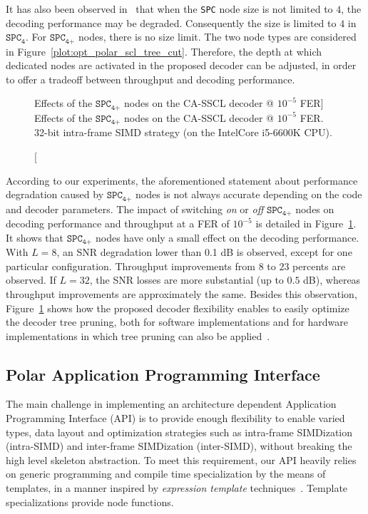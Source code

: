 It has also been observed in~\cite{Sarkis2016} that when the \verb|SPC| node
size is not limited to $4$, the decoding performance may be degraded.
Consequently the size is limited to $4$ in $\texttt{SPC}_\texttt{4}$. For
$\texttt{SPC}_\texttt{4+}$ nodes, there is no size limit. The two node types are
considered in Figure~\ref{plot:opt_polar_scl_tree_cut}. Therefore, the depth at
which dedicated nodes are activated in the proposed decoder can be adjusted, in
order to offer a tradeoff between throughput and decoding performance.

\begin{figure}[htp]
  \centering
  \caption
    [Effects of the $\texttt{SPC}_\texttt{4+}$ nodes on the CA-SSCL decoder @
     $10^{-5}$ FER]
    {Effects of the $\texttt{SPC}_\texttt{4+}$ nodes on the CA-SSCL decoder @
     $10^{-5}$ FER. 32-bit intra-frame SIMD strategy (on the Intel\R Core\TM
     i5-6600K CPU).}
  \label{plot:opt_polar_scl_spc}
\end{figure}

According to our experiments, the aforementioned statement about performance
degradation caused by $\texttt{SPC}_\texttt{4+}$ nodes is not always accurate
depending on the code and decoder parameters. The impact of switching
\textit{on} or \textit{off} $\texttt{SPC}_\texttt{4+}$ nodes on decoding
performance and throughput at a FER of $10^{-5}$ is detailed in
Figure~\ref{plot:opt_polar_scl_spc}. It shows that $\texttt{SPC}_\texttt{4+}$
nodes have only a small effect on the decoding performance. With $L=8$, an SNR
degradation lower than 0.1 dB is observed, except for one particular
configuration. Throughput improvements from $8$ to $23$ percents are observed.
If $L=32$, the SNR losses are more substantial (up to $0.5$ dB), whereas
throughput improvements are approximately the same. Besides this observation,
Figure~\ref{plot:opt_polar_scl_spc} shows how the proposed decoder flexibility
enables to easily optimize the decoder tree pruning, both for software
implementations and for hardware implementations in which tree pruning can also
be applied~\cite{Lin2014}.

\subsection{Polar Application Programming Interface}
\label{sec:opt_polar_api}

The main challenge in implementing an architecture dependent Application
Programming Interface (API) is to provide enough flexibility to enable varied
types, data layout and optimization strategies such as intra-frame SIMDization
(intra-SIMD) and inter-frame SIMDization (inter-SIMD), without breaking the high
level skeleton abstraction. To meet this requirement, our API heavily relies on
generic programming and compile time specialization by the means of \Cxx
templates, in a manner inspired by \emph{expression template}
techniques~\cite{Stroustrup2013}. Template specializations provide node
functions.

